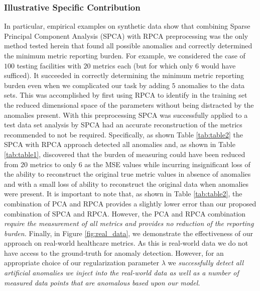 \documentclass[conference]{IEEEtran}
\begin{document}
\subsubsection {Illustrative Specific Contribution}
In particular, empirical examples on synthetic data show that combining Sparse Principal Component Analysis (SPCA) with RPCA preprocessing was the only method tested herein that found all possible anomalies 
and correctly determined the minimum metric reporting burden. For example, we considered the case of $100$ testing facilities with $20$ metrics each (but for which only $6$ would have sufficed). It succeeded in correctly determining the minimum metric reporting burden even when we  complicated our task by adding $5$ anomalies to the  data sets.  This was accomplished by first using RPCA  to identify in the training set the reduced dimensional space of the parameters without being distracted by the anomalies present.  With this preprocessing SPCA was successfully applied to a test data set analysis by SPCA had an accurate reconstruction of the metrics recommended to not be required.  
Specifically, as shown Table \ref{tab:table2} the SPCA with RPCA approach detected all anomalies  and, as shown in Table \ref{tab:table1},  discovered that the burden of measuring could have been reduced from $20$ metrics to only $6$ as the MSE values while incurring insignificant loss of the ability to reconstruct the original true metric values in absence of anomalies and with a small loss of ability to reconstruct the original data when anomalies were present.  It is important to note that, as shown in Table \ref{tab:table2}, the combination of PCA and RPCA provides a slightly lower error than our proposed combination of SPCA and RPCA.  However, the PCA and RPCA combination \emph{require the measurement of all metrics and provides no reduction of the reporting burden.}  Finally, in  Figure \ref{fig:real_data}, we demonstrate the effectiveness of our approach on real-world healthcare metrics.   As this is real-world data we do not have access to the ground-truth for anomaly detection.  However, for an appropriate choice of our regularization parameter $\lambda$ we \emph{successfully detect all artificial anomalies we inject into the real-world data as well as a number of measured data points that are anomalous based upon our model.}
\end{document}
